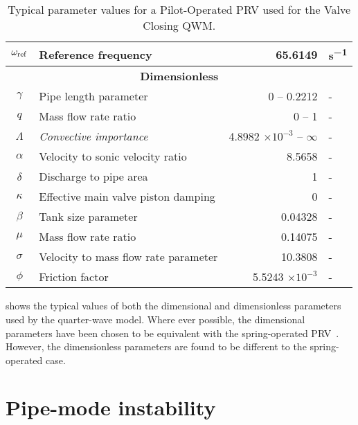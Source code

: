 \begin{table}[ht]
\begin{tabular}{c|l|r|l}
        $\omega_{\rm{ref}}$ & Reference frequency & 65.6149 & \si{s^{-1}} \\ \hline \hline
        \multicolumn{4}{c}{\textbf{Dimensionless}} \\ \hline
        $\gamma$ & Pipe length parameter & 0 -- 0.2212 & - \\ \hline
        $q$ & Mass flow rate ratio & 0 -- 1 & - \\ \hline
        $\Lambda$ & \textit{Convective importance} & 4.8982 $\times 10^{-3}$ -- $\infty$ & - \\ \hline
        $\alpha$ & Velocity to sonic velocity ratio & 8.5658 & - \\ \hline
        $\delta$ & Discharge to pipe area & 1 & - \\ \hline
        $\kappa$ & Effective main valve piston damping & 0 & - \\ \hline
        $\beta$ & Tank size parameter & 0.04328 & - \\ \hline
        $\mu$ & Mass flow rate ratio & 0.14075 & - \\ \hline
        $\sigma$ & Velocity to mass flow rate parameter & 10.3808 & - \\ \hline
        $\phi$ & Friction factor & 5.5243 $\times 10^{-3}$ & - \\
    \end{tabular}
    \caption{Typical parameter values for a Pilot-Operated PRV used for the Valve Closing QWM.}
    \label{tab: ValveClosingQWMParameterValues}
\end{table}

 shows the typical values of both the dimensional and dimensionless parameters used by the quarter-wave model. Where ever possible, the dimensional parameters have been chosen to be equivalent with the spring-operated PRV~\cite{Hos2016DynamicService}. However, the dimensionless parameters are found to be different to the spring-operated case.

\section{Pipe-mode instability} \label{subsec: QWMAnalyticalBound}

